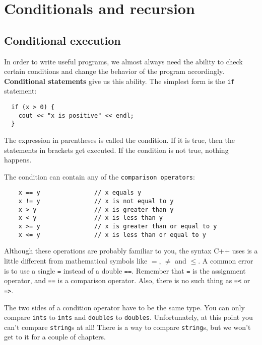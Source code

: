 



\chapter{Conditionals and recursion}
\label{condrecursion}

\section{Conditional execution}

In order to write useful programs, we almost always need the ability
to check certain conditions and change the behavior of the program
accordingly.  {\bf Conditional statements} give us this ability.  The
simplest form is the {\tt if} statement:

\begin{verbatim}
  if (x > 0) {
    cout << "x is positive" << endl;
  }
\end{verbatim}
%
The expression in parentheses is called the condition.
If it is true, then the statements in brackets get executed.
If the condition is not true, nothing happens.


The condition can contain any of the {\tt comparison operators}:

\begin{verbatim}
    x == y               // x equals y
    x != y               // x is not equal to y
    x > y                // x is greater than y
    x < y                // x is less than y
    x >= y               // x is greater than or equal to y
    x <= y               // x is less than or equal to y
\end{verbatim}
%
Although these operations are probably familiar to you, the
syntax C++ uses is a little different from mathematical
symbols like $=$, $\neq$ and $\le$.  A common error is
to use a single {\tt =} instead of a double {\tt ==}.  Remember
that {\tt =} is the assignment operator, and {\tt ==} is
a comparison operator.  Also, there is no such thing as
{\tt =<} or {\tt =>}.

The two sides of a condition operator have to be the same
type.  You can only compare {\tt ints} to {\tt ints} and
{\tt doubles} to {\tt doubles}.  Unfortunately, at this
point you can't compare {\tt string}s at all!  There is
a way to compare {\tt string}s, but we won't get to it for a couple
of chapters.

